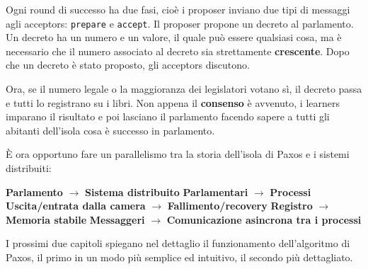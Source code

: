 Ogni round di successo ha due fasi, cioè i proposer inviano due tipi di messaggi agli acceptors: \texttt{prepare} e \texttt{accept}.
Il proposer propone un decreto al parlamento. Un decreto ha un numero e un valore, il quale può essere qualsiasi cosa, ma è necessario che il numero associato al decreto sia strettamente \textbf{crescente}.
Dopo che un decreto è stato proposto, gli acceptors discutono.

Ora, se il numero legale o la maggioranza dei legislatori votano sì, il decreto passa e tutti lo registrano su i libri. Non appena il \textbf{consenso} è avvenuto, i learners imparano il risultato e poi lasciano il parlamento facendo sapere a tutti gli abitanti dell'isola cosa è successo in parlamento.

\vspace{5mm}

\noindent È ora opportuno fare un parallelismo tra la storia dell'isola di Paxos e i sistemi distribuiti:

\vspace{5mm}

\noindent\textbf{Parlamento} $\rightarrow$ \textbf{Sistema distribuito}\newline
\textbf{Parlamentari} $\rightarrow$ \textbf{Processi}\newline
\textbf{Uscita/entrata dalla camera} $\rightarrow$ \textbf{Fallimento/recovery}\newline
\textbf{Registro} $\rightarrow$ \textbf{Memoria stabile}\newline
\textbf{Messaggeri} $\rightarrow$ \textbf{Comunicazione asincrona tra i processi}\newline

\vspace{3mm}

\noindent I prossimi due capitoli spiegano nel dettaglio il funzionamento dell'algoritmo di Paxos, il primo in un modo più semplice ed intuitivo, il secondo più dettagliato.

